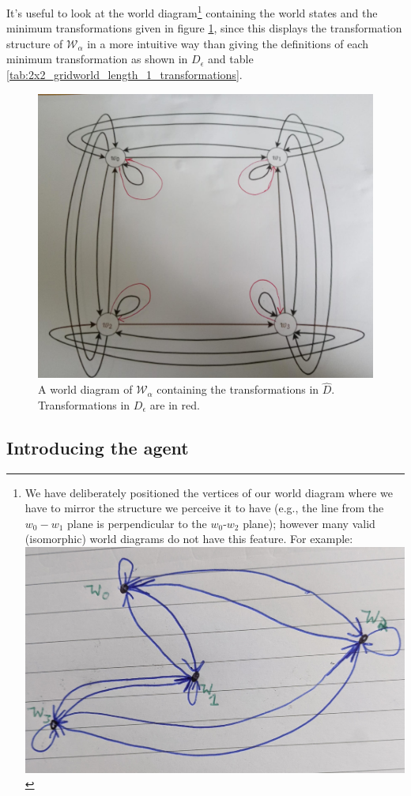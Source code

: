 It's useful to look at the world diagram\footnote{
We have deliberately positioned the vertices of our world diagram where we have to mirror the structure we perceive it to have (e.g., the line from the $w_{0}-w_{1}$ plane is perpendicular to the $w_{0}$-$w_{2}$ plane); however many valid (isomorphic) world diagrams do not have this feature.
For example:
\includegraphics[width=0.5\linewidth]{2MathematicalFramework/Images/2x2_cyclical_min_trans_quirky.jpg}
}
containing the world states and the minimum transformations given in figure \ref{fig:2x2_cyclical_minimum_transformations}, since this displays the transformation structure of $\mathscr{W}_{\alpha}$ in a more intuitive way than giving the definitions of each minimum transformation as shown in $D_{\epsilon}$ and table \ref{tab:2x2_gridworld_length_1_transformations}.

\begin{figure}[H]
	\centering
	\includegraphics[width=0.5\linewidth]{2MathematicalFramework/Images/2x2_cyclical_minimum_transformations.jpeg}
	\caption{
		A world diagram of $\mathscr{W}_{\alpha}$ containing the transformations in $\hat{D}$.
		Transformations in $D_{\epsilon}$ are in red.
	}
	\label{fig:2x2_cyclical_minimum_transformations}
\end{figure}


\subsection{Introducing the agent}

